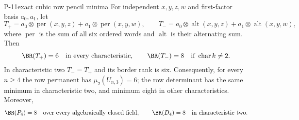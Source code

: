 \begin{finding}{P-11}{exact cubic row pencil minima}
For independent $x,y,z,w$ and first-factor basis $a_0,a_1$,
let
\[
 T_+=a_0\otimes\operatorname{per}(x,y,z)
       +a_1\otimes\operatorname{per}(x,y,w),\qquad
 T_-=a_0\otimes\operatorname{alt}(x,y,z)
       +a_1\otimes\operatorname{alt}(x,y,w),
\]
where $\operatorname{per}$ is the sum of all six ordered
words and $\operatorname{alt}$ is their alternating sum.
Then
\[
 \BR(T_+)=6\quad\hbox{in every characteristic},
 \qquad
 \BR(T_-)=8\quad\hbox{if }\operatorname{char}k\ne2.
\]
In characteristic two $T_-=T_+$ and its border rank is six.
Consequently, for every $n\geq4$ the row permanent has
$\mu_2(U_{n,3})=6$; the row determinant has the same
minimum in characteristic two, and minimum eight
in other characteristics. Moreover,
\[
 \BR(P_4)=8\quad\hbox{over every algebraically closed field},
 \qquad \BR(D_4)=8\quad\hbox{in characteristic two}.
\]
\end{finding}
